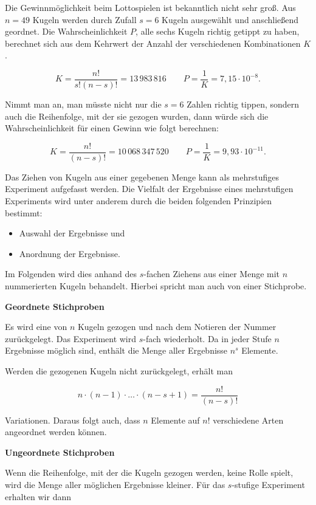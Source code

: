 \begin{beispiel}[Lotto]
Die Gewinnmöglichkeit beim Lottospielen ist bekanntlich nicht sehr groß. Aus $n = 49$ Kugeln werden durch Zufall $s = 6$ Kugeln ausgewählt und anschließend geordnet. Die Wahrscheinlichkeit $P$, alle sechs Kugeln richtig getippt zu haben, berechnet sich aus dem Kehrwert der Anzahl der verschiedenen Kombinationen $K$.

$$
K = \frac{n!}{s!(n-s)!} = 13\,983\,816 \qquad P = \frac{1}{K} = 7{,}15 \cdot 10^{-8}.
$$

Nimmt man an, man müsste nicht nur die $s = 6$ Zahlen richtig tippen, sondern auch die Reihenfolge, mit der sie gezogen wurden, dann würde sich die Wahrscheinlichkeit für einen Gewinn wie folgt berechnen:

$$
K = \frac{n!}{(n-s)!} = 10\,068\,347\,520 \qquad P = \frac{1}{K} = 9{,}93 \cdot 10^{-11}.
$$
\end{beispiel}

Das Ziehen von Kugeln aus einer gegebenen Menge kann als mehrstufiges Experiment aufgefasst werden. Die Vielfalt der Ergebnisse eines mehrstufigen Experiments wird unter anderem durch die beiden folgenden Prinzipien bestimmt:

\begin{itemize}
  \item Auswahl der Ergebnisse und
  \item Anordnung der Ergebnisse.
\end{itemize}

Im Folgenden wird dies anhand des $s$-fachen Ziehens aus einer Menge mit $n$ nummerierten Kugeln behandelt. Hierbei spricht man auch von einer Stichprobe.

\textbf{Geordnete Stichproben}

Es wird eine von $n$ Kugeln gezogen und nach dem Notieren der Nummer zurückgelegt. Das Experiment wird $s$-fach wiederholt. Da in jeder Stufe $n$ Ergebnisse möglich sind, enthält die Menge aller Ergebnisse $n^s$ Elemente.

Werden die gezogenen Kugeln nicht zurückgelegt, erhält man

$$
n \cdot (n-1) \cdot \ldots \cdot (n-s+1) = \frac{n!}{(n-s)!}
$$

Variationen. Daraus folgt auch, dass $n$ Elemente auf $n!$ verschiedene Arten angeordnet werden können.

\textbf{Ungeordnete Stichproben}

Wenn die Reihenfolge, mit der die Kugeln gezogen werden, keine Rolle spielt, wird die Menge aller möglichen Ergebnisse kleiner. Für das $s$-stufige Experiment erhalten wir dann

